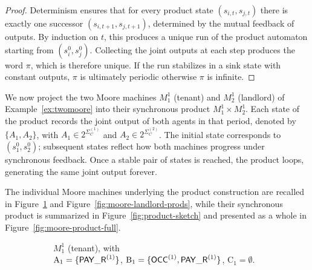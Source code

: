  \begin{proof}
  Determinism ensures that for every product state $(s_{i,t},s_{j,t})$ there is exactly one
  successor $(s_{i,t+1},s_{j,t+1})$, determined by the mutual feedback of outputs.
  By induction on $t$, this produces a unique run of the product automaton starting from $(s^0_i,s^0_j)$.
  Collecting the joint outputs at each step produces the word $\pi$, which is therefore unique.
  If the run stabilizes in a sink state with constant outputs, $\pi$ is ultimately periodic
  otherwise $\pi$ is infinite.
  \end{proof}
  
  \begin{example}
  \label{ex:product-automaton}
  We now project the two Moore machines $M_1^1$ (tenant) and $M_2^1$ (landlord) of
  Example~\ref{ex:twomoore} into their synchronous product $M_1^1 \times M_2^1$.
  Each state of the product records the joint output of both agents in that period, denoted by $\{A_1,A_2\}$, with $A_1\in 2^{\Sigma_C^{(1)}}$ and $A_2\in 2^{\Sigma_C^{(2)}}$.
  The initial state corresponds to $(s^0_1,s^0_2)$; subsequent states reflect how both machines
  progress under synchronous feedback. Once a stable pair of states is reached, the product
  loops, generating the same joint output forever.

  The individual Moore machines underlying the product construction are recalled in Figure~\ref{fig:moore-tenant-prod} and Figure~\ref{fig:moore-landlord-prods}, while their synchronous product is summarized in Figure~\ref{fig:product-sketch} and presented as a whole in Figure~\ref{fig:moore-product-full}.
  \begin{figure}[h]
  \centering
  \begin{subfigure}[t]{0.70\textwidth}
  \centering
  \caption{$M_1^1$ (tenant), with\\ $\mathrm{A_1}=\{\mathsf{PAY\_R}^{(1)}\}$, $\mathrm{B_1}=\{\mathsf{OCC}^{(1)},\mathsf{PAY\_R}^{(1)}\}$, $\mathrm{C_1}=\emptyset$.}
  \label{fig:moore-tenant-prod}
  \end{subfigure}
  \vspace{0.5cm}
  \begin{subfigure}[t]{0.70\textwidth}
  \centering
\end{subfigure}
\end{figure}
\end{example}

